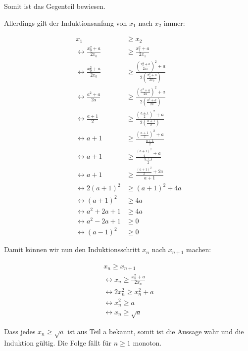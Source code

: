 \documentclass[a4paper,german,12pt,smallheadings]{scrartcl}
\begin{document}
Somit ist das Gegenteil bewiesen.

Allerdings gilt der Induktionsanfang von $x_1$ nach $x_2$ immer:

\begin{align*}
  x_1 &\ge x_2 \\
  \leftrightarrow \frac{x_0^2 + a}{2x_0} &\ge \frac{x_1^2 + a}{2x_1} \\
  \leftrightarrow \frac{x_0^2 + a}{2x_0} &\ge \frac{\left(\frac{x_0^2 + a}{2x_0}\right)^2 + a}{2\left(\frac{x_0^2 + a}{2x_0}\right)} \\
  \leftrightarrow \frac{a^2 + a}{2a} &\ge \frac{\left(\frac{a^2 + a}{2a}\right)^2 + a}{2\left(\frac{a^2 + a}{2a}\right)} \\
  \leftrightarrow \frac{a + 1}{2} &\ge \frac{\left(\frac{a + 1}{2}\right)^2 + a}{2\left(\frac{a + 1}{2}\right)} \\
  \leftrightarrow a + 1 &\ge \frac{\left(\frac{a + 1}{2}\right)^2 + a}{\frac{a + 1}{2}} \\
  \leftrightarrow a + 1 &\ge \frac{\frac{(a+1)^2}{4} + a}{\frac{a + 1}{2}} \\
  \leftrightarrow a + 1 &\ge \frac{\frac{(a+1)^2}{2} + 2a}{a+1} \\
  \leftrightarrow 2(a + 1)^2 &\ge (a+1)^2 + 4a \\
  \leftrightarrow (a + 1)^2 &\ge 4a \\
  \leftrightarrow a^2+2a+1 &\ge 4a \\
  \leftrightarrow a^2-2a+1 &\ge 0 \\
  \leftrightarrow (a-1)^2 &\ge 0
\end{align*}

Damit können wir nun den Induktionsschritt $x_n$ nach $x_{n+1}$ machen:

\begin{align*}
  x_{n} \ge x_{n+1} \\
  \leftrightarrow x_n \ge \frac{x_n^2 + a}{2x_n} \\
  \leftrightarrow 2x_n^2 \ge x_n^2 + a \\
  \leftrightarrow x_n^2 \ge a \\
  \leftrightarrow x_n \ge \sqrt{a}
\end{align*}

Dass jedes $x_n \ge \sqrt{a}$ ist aus Teil a bekannt, somit ist die Aussage
wahr und die Induktion gültig. Die Folge fällt für $n \ge 1$ monoton.
\end{document}
